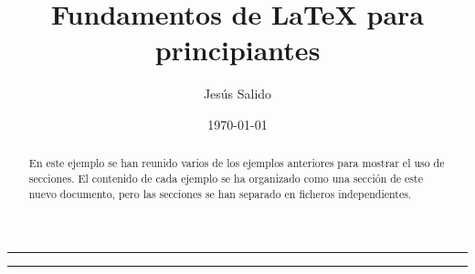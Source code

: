 \documentclass[11pt,a4paper]{article}
\author{Jesús Salido}
\title{Fundamentos de \LaTeX{} para principiantes}
\date{\today}
\begin{document}
\maketitle 

\begin{abstract}
En este ejemplo se han reunido varios de los ejemplos anteriores para mostrar el uso de secciones. El contenido de cada ejemplo se ha organizado como una sección de este nuevo documento, pero las secciones se han separado en ficheros independientes.
\end{abstract}

\hrule %
\tableofcontents %
\vspace{0.5cm} %
\hrule




\end{document}
